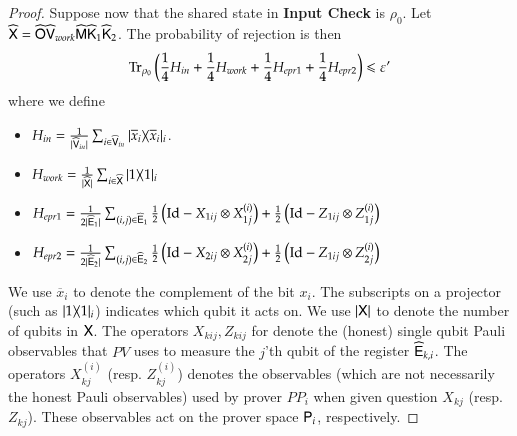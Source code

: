 \begin{proof}
Suppose now that the shared state in \textbf{Input Check} is $\rho_{0}$. Let $\widehat{{\mathsf{X}}} = \widehat{{\mathsf{O}}} \widehat{{\mathsf{V}}}_{work} \widehat{{\mathsf{M}}} \widehat{{\mathsf{K}}}_1 \widehat{{\mathsf{K}}}_2$. The probability of rejection is then
	\begin{equation}
		\Tr_{\rho_{0}} \Paren{ \frac{1}{4}H_{in} + \frac{1}{4}H_{work} + \frac{1}{4} H_{epr1} + \frac{1}{4} H_{epr2} } \leq \eps'
		\label{eq:init}
	\end{equation}
	where we define 
	\begin{itemize}
		\item $H_{in} = \frac{1}{|\widehat{{\mathsf{V}}}_{in}|} \sum_{i \in \widehat{{\mathsf{V}}}_{in}} |\overline{x}_i\rangle\! \langle \overline{x}_i|_i$.
		\item $H_{work} = \frac{1}{|\widehat{{\mathsf{X}}}|} \sum_{i \in \widehat{{\mathsf{X}}}} |1\rangle\! \langle 1|_i$
		\item $H_{epr1} = \frac{1}{2|\widehat{{\mathsf{E}}}_1|} \sum_{(i,j) \in \widehat{{\mathsf{E}}}_1} \frac{1}{2} \left( \mathop{\mathrm{Id}}\!\mathinner{} - X_{1ij} \otimes X^{(i)}_{1j}\right) + \frac{1}{2} \left( \mathop{\mathrm{Id}}\!\mathinner{} - Z_{1ij} \otimes Z^{(i)}_{1j}\right)$
		\item $H_{epr2} = \frac{1}{2|\widehat{{\mathsf{E}}}_2|} \sum_{(i,j) \in \widehat{{\mathsf{E}}}_2} \frac{1}{2} \left( \mathop{\mathrm{Id}}\!\mathinner{} - X_{2ij} \otimes X^{(i)}_{2j}\right) + \frac{1}{2} \left( \mathop{\mathrm{Id}}\!\mathinner{} - Z_{1ij} \otimes Z^{(i)}_{2j}\right)$
	\end{itemize}
	We use $\overline{x}_i$ to denote the complement of the bit $x_i$. The subscripts on a projector (such as $|1\rangle\! \langle 1|_i$) indicates which qubit it acts on. We use $|{\mathsf{X}}|$ to denote the number of qubits in ${\mathsf{X}}$. The operators $X_{kij},Z_{kij}$ for denote the (honest) single qubit Pauli observables that $PV$ uses to measure the $j$'th qubit of the register $\widehat{{\mathsf{E}}}_{k,i}$. The operators $X^{(i)}_{kj}$ (resp. $Z^{(i)}_{kj}$) denotes the observables (which are not necessarily the honest Pauli observables) used by prover $PP_i$ when given question $X_{kj}$ (resp. $Z_{kj}$). These observables act on the prover space ${\mathsf{P}}_i$, respectively.

	
%	
%	
	
\end{proof}

